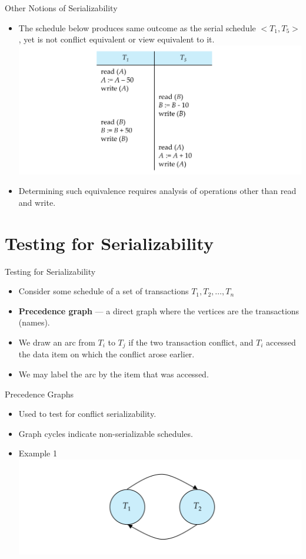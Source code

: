 \documentclass{beamer}
\begin{document}
\begin{frame}{Other Notions of Serializability}
    \begin{itemize}
        \item The schedule below produces same outcome as the serial schedule $< T_1, T_5 >$, yet is not conflict equivalent or view equivalent to it.
            \includegraphics[width=.9\textwidth]{figures/view_ser2}
        \item Determining such equivalence requires analysis of operations other than read and write.
    \end{itemize}
\end{frame}

\section{Testing for Serializability}

\begin{frame}{Testing for Serializability}
    \begin{itemize}
        \item Consider some schedule of a set of transactions $T_1, T_2, \ldots, T_n$
        \item \textbf{Precedence graph} — a direct graph where the vertices are the transactions (names).
        \item We draw an arc from $T_i$ to $T_j$ if the two transaction conflict, and $T_i$ accessed the data item on which the conflict arose earlier.
        \item We may label the arc by the item that was accessed.
    \end{itemize}
\end{frame}

\begin{frame}{Precedence Graphs}
    \begin{itemize}
        \item Used to test for conflict serializability.
        \item Graph cycles indicate non-serializable schedules.
        \item Example 1
            \includegraphics[width=.9\textwidth]{figures/graph1}
    \end{itemize}
\end{frame}
\end{document}

